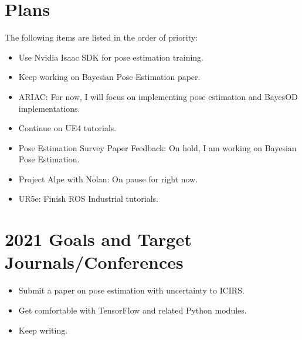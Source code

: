 \documentclass[11pt]{article}
\begin{document}

\section{Plans}
The following items are listed in the order of priority:

\begin{itemize}
      \item Use Nvidia Isaac SDK for pose estimation training.
      \item Keep working on Bayesian Pose Estimation paper.
      \item ARIAC: For now, I will focus on implementing pose estimation and
            BayesOD implementations.
      \item Continue on UE4 tutorials.
      \item Pose Estimation Survey Paper Feedback: On hold, I am working on
            Bayesian Pose Estimation.
      \item Project Alpe with Nolan: On pause for right now.
      \item UR5e: Finish ROS Industrial tutorials.
\end{itemize}

\section{2021 Goals and Target Journals/Conferences}
\begin{itemize}
      \item Submit a paper on pose estimation with uncertainty to ICIRS.
      \item Get comfortable with TensorFlow and related Python modules.
      \item Keep writing.
\end{itemize}


\newpage


\end{document}
